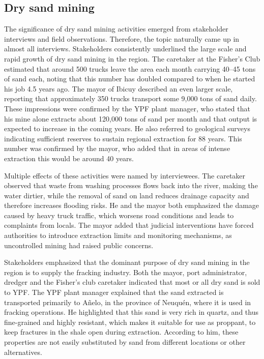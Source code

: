 \subsection{Dry sand mining}
The significance of dry sand mining activities emerged from stakeholder interviews and field observations. Therefore, the topic naturally came up in almost all interviews. Stakeholders consistently underlined the large scale and rapid growth of dry sand mining in the region. The caretaker at the Fisher’s Club estimated that around 500 trucks leave the area each month carrying 40–45 tons of sand each, noting that this number has doubled compared to when he started his job 4.5 years ago. The mayor of Ibicuy described an even larger scale, reporting that approximately 350 trucks transport some 9,000 tons of sand daily. These impressions were confirmed by the YPF plant manager, who stated that his mine alone extracts about 120,000 tons of sand per month and that output is expected to increase in the coming years. He also referred to geological surveys indicating sufficient reserves to sustain regional extraction for 88 years. This number was confirmed by the mayor, who added that in areas of intense extraction this would be around 40 years.

Multiple effects of these activities were named by interviewees. The caretaker observed that waste from washing processes flows back into the river, making the water dirtier, while the removal of sand on land reduces drainage capacity and therefore increases flooding risks. He and the mayor both emphasized the damage caused by heavy truck traffic, which worsens road conditions and leads to complaints from locals. The mayor added that judicial interventions have forced authorities to introduce extraction limits and monitoring mechanisms, as uncontrolled mining had raised public concerns.

Stakeholders emphasized that the dominant purpose of dry sand mining in the region is to supply the fracking industry. Both the mayor, port administrator, dredger and the Fisher's club caretaker indicated that most or all dry sand is sold to YPF. The YPF plant manager explained that the sand extracted is transported primarily to Añelo, in the province of Neuquén, where it is used in fracking operations. He highlighted that this sand is very rich in quartz, and thus fine-grained and highly resistant, which makes it suitable for use as proppant, to keep fractures in the shale open during extraction. According to him, these properties are not easily substituted by sand from different locations or other alternatives.

